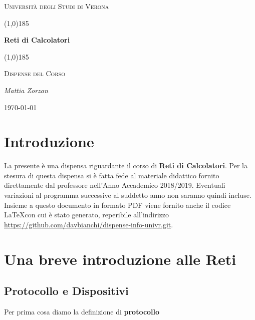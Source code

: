 \documentclass{article}
\begin{document}
    \clearpage

    \begin{titlepage}
        \centering
        \vspace*{\fill}
        {\scshape\LARGE Università degli Studi di Verona \par}
        \vspace{1.5cm}
        \line(1,0){185} \\
        {\huge\bfseries Reti di Calcolatori \par}
        \line(1,0){185} \\
        \vspace{0.5cm}
        {\scshape\LARGE Dispense del Corso \par}
        \vspace{2cm}
        {\Large\itshape Mattia Zorzan \par}
        \vspace{1cm}

        \vspace{5cm}
        \vspace*{\fill}
        {\large \today \par}
    \end{titlepage}
    \thispagestyle{empty}

    \newpage
    \tableofcontents
    \thispagestyle{empty}

    \newpage
    \thispagestyle{empty}
    \section{Introduzione}
        La presente è una dispensa riguardante il corso di \textbf{Reti di Calcolatori}. Per la stesura di questa dispensa si è fatta fede al materiale didattico fornito direttamente dal professore nell'Anno Accademico 2018/2019. Eventuali variazioni al programma successive al suddetto anno non saranno quindi incluse.\\
        Insieme a questo documento in formato PDF viene fornito anche il codice \LaTeX  con cui è stato generato, reperibile all'indirizzo \url{https://github.com/davbianchi/dispense-info-univr.git}.

\newpage
    \section{Una breve introduzione alle Reti}
        \subsection{Protocollo e Dispositivi}
        Per prima cosa diamo la definizione di \textbf{protocollo}
\end{document}
